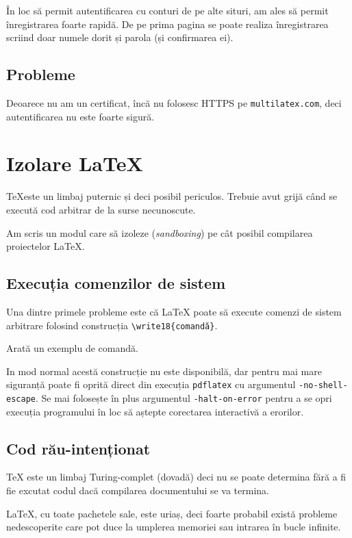 \documentclass[a4wide,12pt]{report}
\newcommand{\eng}[1]{\emph{#1}} %
\newcommand{\cod}[1]{\texttt{#1}}
\newcommand{\idee}[1]{{\color{red} #1}}
\newcommand{\poate}[1]{#1}
\begin{document}
În loc să permit autentificarea cu conturi de pe alte situri, am ales să permit
înregistrarea foarte rapidă. De pe prima pagina se poate realiza înregistrarea
scriind doar numele dorit și parola (și confirmarea ei).

\subsection{Probleme}

Deoarece nu am un certificat, încă nu folosesc HTTPS pe \cod{multilatex.com},
deci autentificarea nu este foarte sigură.

\section{Izolare \LaTeX}

\TeX este un limbaj puternic și deci posibil periculos. Trebuie avut grijă când
se execută cod arbitrar de la surse necunoscute.

Am scris un modul care să izoleze (\eng{sandboxing}) pe cât posibil compilarea
proiectelor \LaTeX.

\subsection{Execuția comenzilor de sistem}

Una dintre primele probleme este că \LaTeX{} poate să execute comenzi de sistem
arbitrare folosind construcția \cod{\textbackslash write18\{comandă\}}.

\idee{Arată un exemplu de comandă.}

In mod normal acestă construcție nu este disponibilă, dar pentru mai mare
siguranță poate fi oprită direct din execuția \cod{pdflatex} cu argumentul
\cod{-no-shell-escape}. \poate{Se mai folosește în plus argumentul
\cod{-halt-on-error} pentru a se opri execuția programului în loc să aștepte
corectarea interactivă a erorilor.}

\subsection{Cod rău-intenționat}

\TeX{} este un limbaj Turing-complet \idee{(dovadă)} deci nu se poate determina
fără a fi fie excutat codul dacă compilarea documentului se va termina.

\LaTeX{}, cu toate pachetele sale, este uriaș, deci foarte probabil există
probleme nedescoperite care pot duce la umplerea memoriei sau intrarea în bucle
infinite.
\end{document}
